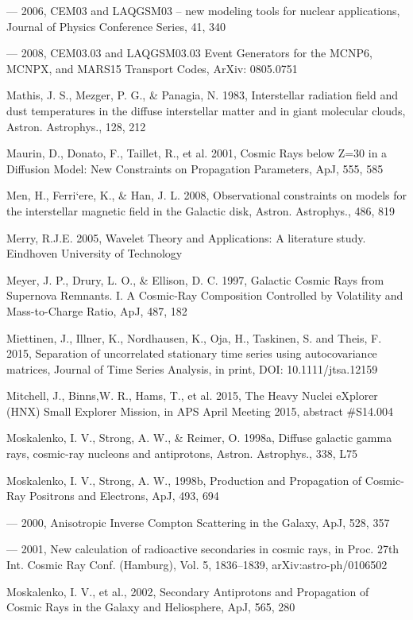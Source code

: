 --- 2006, CEM03 and LAQGSM03 -- new modeling tools for nuclear applications, Journal of Physics Conference Series, 41, 340

--- 2008, CEM03.03 and LAQGSM03.03 Event Generators for the MCNP6, MCNPX, and MARS15 Transport Codes, ArXiv: 0805.0751

Mathis, J. S., Mezger, P. G., \& Panagia, N. 1983, Interstellar radiation field and dust temperatures in the diffuse interstellar matter and in giant molecular clouds, Astron. Astrophys., 128, 212

Maurin, D., Donato, F., Taillet, R., et al. 2001, Cosmic Rays below Z=30 in a Diffusion Model: New Constraints on Propagation Parameters, ApJ, 555, 585

Men, H., Ferri`ere, K., \& Han, J. L. 2008, Observational constraints on models for the interstellar magnetic field in the Galactic disk, Astron. Astrophys., 486, 819

Merry, R.J.E. 2005, Wavelet Theory and Applications: A literature study. Eindhoven University of Technology

Meyer, J. P., Drury, L. O., \& Ellison, D. C. 1997, Galactic Cosmic Rays from Supernova Remnants. I. A Cosmic-Ray Composition Controlled by Volatility and Mass-to-Charge Ratio, ApJ, 487, 182

Miettinen, J., Illner, K., Nordhausen, K., Oja, H., Taskinen, S. and Theis, F. 2015, Separation of uncorrelated stationary time series using autocovariance matrices, Journal of Time Series Analysis, in print, DOI: 10.1111/jtsa.12159

Mitchell, J., Binns,W. R., Hams, T., et al. 2015, The Heavy Nuclei eXplorer (HNX) Small Explorer Mission, in APS April Meeting 2015, abstract \#S14.004

Moskalenko, I. V., Strong, A. W., \& Reimer, O. 1998a, Diffuse galactic gamma rays, cosmic-ray nucleons and antiprotons, Astron. Astrophys., 338, L75

Moskalenko, I. V., Strong, A. W., 1998b, Production and Propagation of Cosmic-Ray Positrons and Electrons, ApJ, 493, 694

--- 2000, Anisotropic Inverse Compton Scattering in the Galaxy, ApJ, 528, 357

--- 2001, New calculation of radioactive secondaries in cosmic rays, in Proc. 27th Int. Cosmic Ray Conf. (Hamburg), Vol. 5, 1836--1839, arXiv:astro-ph/0106502

Moskalenko, I. V., et al., 2002, Secondary Antiprotons and Propagation of Cosmic Rays in the Galaxy and Heliosphere, ApJ, 565, 280

